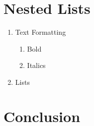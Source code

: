 \documentclass{article} %
\begin{document}
    \section{Nested Lists}

      \begin{enumerate}

        \item Text Formatting

        \begin{enumerate}

          \item Bold
          \item Italics

        \end{enumerate}

        \item Lists

      \end{enumerate}

    \section{Conclusion}
\end{document}
